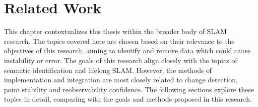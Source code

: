 \section{Related Work}
\label{sec:related_work}

This chapter contextualizes this thesis within the broader body of SLAM research. The topics covered here are chosen based on their relevance to the objectives of this research, aiming to identify and remove data which could cause instability or error. The goals of this research align closely with the topics of semantic identification and lifelong SLAM. However, the methods of implementation and integration are most closely related to change detection, point stability and reobservability confidence. The following sections explore these topics in detail, comparing with the goals and methods proposed in this research.

% 
